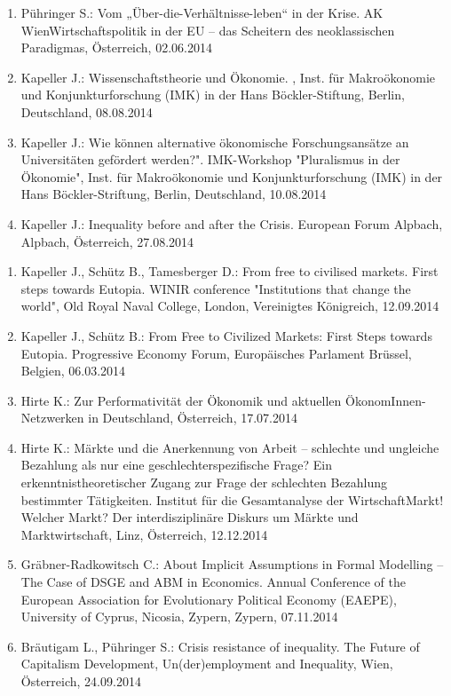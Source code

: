 \begin{enumerate}
	\item Pühringer S.: Vom „Über-die-Verhältnisse-leben“ in der Krise. AK WienWirtschaftspolitik in der EU – das Scheitern des neoklassischen Paradigmas, Österreich, 02.06.2014
	\item Kapeller J.: Wissenschaftstheorie und Ökonomie. , Inst. für Makroökonomie und Konjunkturforschung (IMK) in der Hans Böckler-Stiftung, Berlin, Deutschland, 08.08.2014
	\item Kapeller J.: Wie können alternative ökonomische Forschungsansätze an Universitäten gefördert werden?". IMK-Workshop "Pluralismus in der Ökonomie", Inst. für Makroökonomie und Konjunkturforschung (IMK) in der Hans Böckler-Striftung, Berlin, Deutschland, 10.08.2014
	\item Kapeller J.: Inequality before and after the Crisis. European Forum Alpbach, Alpbach, Österreich, 27.08.2014
\end{enumerate}

\begin{enumerate}
	\item Kapeller J., Schütz B., Tamesberger D.: From free to civilised markets. First steps towards Eutopia. WINIR conference "Institutions that change the world", Old Royal Naval College, London, Vereinigtes Königreich, 12.09.2014
	\item Kapeller J., Schütz B.: From Free to Civilized Markets: First Steps towards Eutopia. Progressive Economy Forum, Europäisches Parlament Brüssel, Belgien, 06.03.2014
	\item Hirte K.: Zur Performativität der Ökonomik und aktuellen ÖkonomInnen-Netzwerken in Deutschland, Österreich, 17.07.2014
	\item Hirte K.: Märkte und die Anerkennung von Arbeit – schlechte und ungleiche Bezahlung als nur eine geschlechterspezifische Frage? Ein erkenntnistheoretischer Zugang zur Frage der schlechten Bezahlung bestimmter Tätigkeiten. Institut für die Gesamtanalyse der WirtschaftMarkt! Welcher Markt? Der interdisziplinäre Diskurs um Märkte und Marktwirtschaft, Linz, Österreich, 12.12.2014
	\item Gräbner-Radkowitsch C.: About Implicit Assumptions in Formal Modelling – The Case of DSGE and ABM in Economics. Annual Conference of the European Association for Evolutionary Political Economy (EAEPE), University of Cyprus, Nicosia, Zypern, Zypern, 07.11.2014
	\item Bräutigam L., Pühringer S.: Crisis resistance of inequality. The Future of Capitalism Development, Un(der)employment and Inequality, Wien, Österreich, 24.09.2014
\end{enumerate}

